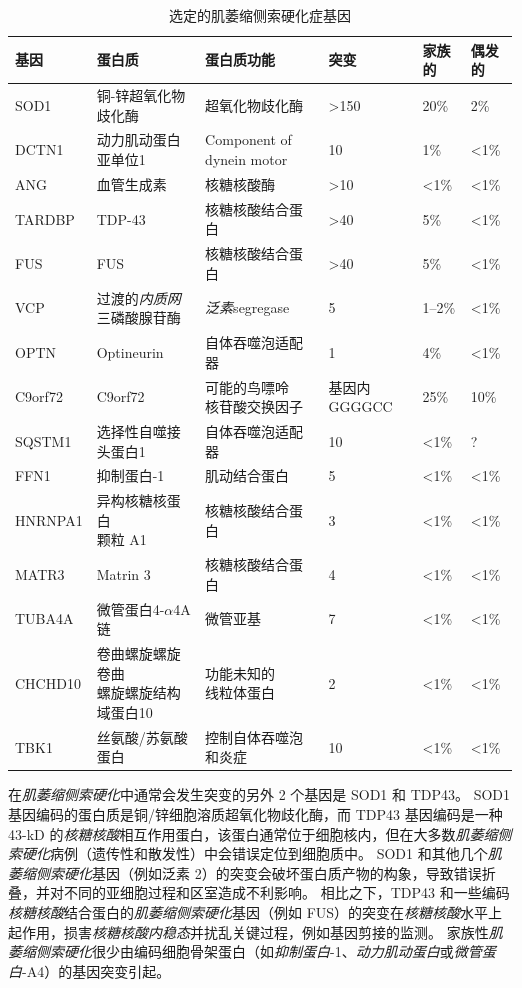 \begin{table}[htbp]
	\caption{选定的肌萎缩侧索硬化症基因\cite{taylor2016decoding}} \label{tab:57_2} \centering
	\begin{tabular}{llllll}
		\toprule
		基因 & 蛋白质 & 蛋白质功能 & 突变 & 家族的 & 偶发的 \\
		\midrule
		SOD1 & 铜-锌超氧化物歧化酶 & 超氧化物歧化酶 & >150 & 20\% & 2\% \\
		DCTN1 & 动力肌动蛋白亚单位1 & Component of dynein motor & 10 & 1\% & <1\% \\
		ANG & 血管生成素 & 核糖核酸酶 & >10 & <1\% & <1\% \\
		TARDBP & TDP-43 & 核糖核酸结合蛋白 & >40 & 5\% & <1\% \\
		FUS & FUS & 核糖核酸结合蛋白 & >40 & 5\% & <1\% \\
		VCP & \makecell[l]{过渡的\textit{内质网}\\三磷酸腺苷酶} & \textit{泛素}segregase & 5 & 1–2\% & <1\% \\
		OPTN & Optineurin & 自体吞噬泡适配器 & 1 & 4\% & <1\% \\
		C9orf72 & C9orf72 & \makecell[l]{可能的鸟嘌呤\\核苷酸交换因子} & 基因内GGGGCC & 25\% & 10\% \\
		SQSTM1 & 选择性自噬接头蛋白1 & 自体吞噬泡适配器 & 10 & <1\% & ? \\
		FFN1 & 抑制蛋白-1 & 肌动结合蛋白 & 5 & <1\% & <1\% \\
		HNRNPA1 & \makecell[l]{异构核糖核蛋白\\颗粒 A1} & 核糖核酸结合蛋白 & 3 & <1\% & <1\% \\
		MATR3 & Matrin 3 & 核糖核酸结合蛋白 & 4 & <1\% & <1\% \\
		TUBA4A & 微管蛋白4-$\alpha$4A 链 & 微管亚基 & 7 & <1\% & <1\% \\
		CHCHD10 & \makecell[l]{卷曲螺旋螺旋卷曲\\螺旋螺旋结构域蛋白10} & \makecell[l]{功能未知的\\线粒体蛋白} & 2 & <1\% & <1\% \\
		TBK1 & \makecell[l]{丝氨酸/苏氨酸\\蛋白} & \makecell[l]{控制自体吞噬泡\\和炎症} & 10 & <1\% & <1\% \\
		\bottomrule
	\end{tabular}
\end{table}


在\textit{肌萎缩侧索硬化}中通常会发生突变的另外 2 个基因是 SOD1 和 TDP43。
SOD1 基因编码的蛋白质是铜/锌细胞溶质超氧化物歧化酶，而 TDP43 基因编码是一种 43-kD 的\textit{核糖核酸}相互作用蛋白，该蛋白通常位于细胞核内，但在大多数\textit{肌萎缩侧索硬化}病例（遗传性和散发性）中会错误定位到细胞质中。
SOD1 和其他几个\textit{肌萎缩侧索硬化}基因（例如泛素 2）的突变会破坏蛋白质产物的构象，导致错误折叠，并对不同的亚细胞过程和区室造成不利影响。
相比之下，TDP43 和一些编码\textit{核糖核酸}结合蛋白的\textit{肌萎缩侧索硬化}基因（例如 FUS）的突变在\textit{核糖核酸}水平上起作用，损害\textit{核糖核酸}\textit{内稳态}并扰乱关键过程，例如基因剪接的监测。
家族性\textit{肌萎缩侧索硬化}很少由编码细胞骨架蛋白（如\textit{抑制蛋白}-1、\textit{动力肌动蛋白}或\textit{微管蛋白}-A4）的基因突变引起。


